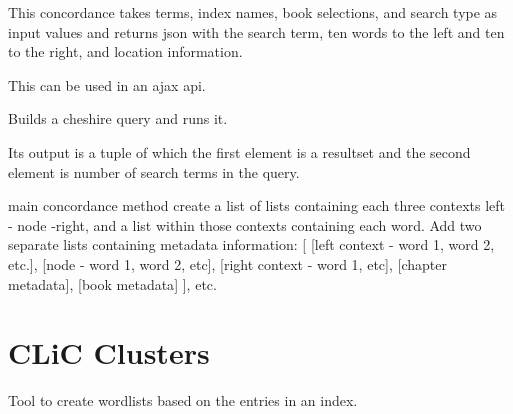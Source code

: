\documentclass[letterpaper,10pt,english]{sphinxmanual}
\begin{document}
\begin{fulllineitems}
\label{apidoc:concordance.Concordance}
This concordance takes terms, index names, book selections, and search type
as input values and returns json with the search term, ten words to the left and
ten to the right, and location information.

This can be used in an ajax api.

\begin{fulllineitems}
\label{apidoc:concordance.Concordance.build_and_run_query}
Builds a cheshire query and runs it.

Its output is a tuple of which the first element is a resultset and
the second element is number of search terms in the query.

\end{fulllineitems}


\begin{fulllineitems}
\label{apidoc:concordance.Concordance.create_concordance}
main concordance method
create a list of lists containing each three contexts left - node -right,
and a list within those contexts containing each word.
Add two separate lists containing metadata information:
{[}
{[}left context - word 1, word 2, etc.{]},
{[}node - word 1, word 2, etc{]},
{[}right context - word 1, etc{]},
{[}chapter metadata{]},
{[}book metadata{]}
{]},
etc.

\end{fulllineitems}


\end{fulllineitems}



\section{CLiC Clusters}
\label{apidoc:clic-clusters}\label{apidoc:module-clusters}
Tool to create wordlists based on the entries in an index.
\end{document}
